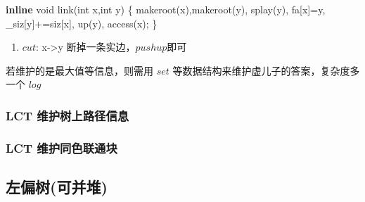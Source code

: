 \documentclass[
]{article}
\newenvironment{Shaded}{}{}
\newcommand{\DataTypeTok}[1]{\textcolor[rgb]{0.56,0.13,0.00}{#1}}
\newcommand{\KeywordTok}[1]{\textcolor[rgb]{0.00,0.44,0.13}{\textbf{#1}}}
\newcommand{\NormalTok}[1]{#1}
\providecommand{\tightlist}{%
  \setlength{\itemsep}{0pt}\setlength{\parskip}{0pt}}
\begin{document}
\begin{Shaded}
\begin{Highlighting}[]
\KeywordTok{inline} \DataTypeTok{void}\NormalTok{ link(}\DataTypeTok{int}\NormalTok{ x,}\DataTypeTok{int}\NormalTok{ y)}
\NormalTok{\{}
\NormalTok{    makeroot(x),makeroot(y),}
\NormalTok{    splay(y),}
\NormalTok{    fa[x]=y,}
\NormalTok{    \_siz[y]+=siz[x],}
\NormalTok{    up(y),}
\NormalTok{    access(x);}
\NormalTok{\}}
\end{Highlighting}
\end{Shaded}

\begin{enumerate}
\def\labelenumi{\arabic{enumi}.}
\setcounter{enumi}{6}
\tightlist
\item
  \(cut\): x-\textgreater y 断掉一条实边，\(pushup\)即可
\end{enumerate}

若维护的是最大值等信息，则需用 \(set\)
等数据结构来维护虚儿子的答案，复杂度多一个 \(log\)

\hypertarget{lct-ux7ef4ux62a4ux6811ux4e0aux8defux5f84ux4fe1ux606f}{%
\subsubsection{LCT
维护树上路径信息}\label{lct-ux7ef4ux62a4ux6811ux4e0aux8defux5f84ux4fe1ux606f}}

\hypertarget{lct-ux7ef4ux62a4ux540cux8272ux8054ux901aux5757}{%
\subsubsection{LCT
维护同色联通块}\label{lct-ux7ef4ux62a4ux540cux8272ux8054ux901aux5757}}

\hypertarget{ux5de6ux504fux6811ux53efux5e76ux5806}{%
\subsection{左偏树(可并堆)}\label{ux5de6ux504fux6811ux53efux5e76ux5806}}
\end{document}
